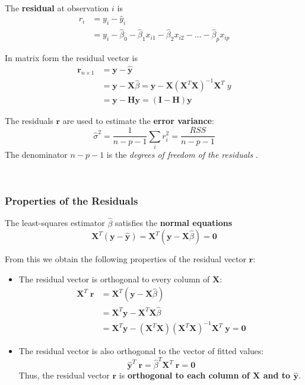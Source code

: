 \documentclass[
]{book}
\begin{document}
~

The \textbf{residual} at observation \(i\) is
\begin{align*}
r_{i} &= y_i - \hat{y}_i \\
&= y_i - \hat{\beta}_0 - \hat{\beta}_1 x_{i1} - \hat{\beta}_2 x_{i2} - \ldots - \hat{\beta}_p x_{ip}
\end{align*}

In matrix form the residual vector is
\begin{align*}
\mathbf{r}_{n\times 1} &= \mathbf{y} - \hat{\mathbf{y}} \\
&= \mathbf{y} - \mathbf{X}\hat{\beta} = \mathbf{y} - \mathbf{X} (\mathbf{X}^T\mathbf{X})^{-1} \mathbf{X}^T\;  y \\
&= \mathbf{y} - \mathbf{H} \mathbf{y} = (\mathbf{I} -\mathbf{H}) \mathbf{y}
\end{align*}

The residuals \(\mathbf{r}\) are used to estimate the \textbf{error variance}:
\[\hat{\sigma}^2 = \frac{1}{n-p-1}\sum_i r_i^2 = \frac{RSS}{n-p-1}\]
The denominator \(n-p-1\) is the \emph{degrees of freedom of the residuals} .

~

\subsubsection*{Properties of the Residuals}\label{properties-of-the-residuals}

The least-squares estimator \(\hat{\beta}\) satisfies the \textbf{normal equations}
\[\mathbf{X}^T (\mathbf{y} - \hat{\mathbf{y}}) = \mathbf{X}^T (\mathbf{y} - \mathbf{X}\hat{\beta}) = \mathbf{0}\]

From this we obtain the following properties of the residual vector \(\mathbf{r}\):

\begin{itemize}
\item
  The residual vector is orthogonal to every column of \(\mathbf{X}\):
  \begin{align*}
  \mathbf{X}^T\; \mathbf{r} &= \mathbf{X}^T (\mathbf{y}-\mathbf{X}\hat{\beta})\\
  &= \mathbf{X}^T \mathbf{y} - \mathbf{X}^T\mathbf{X}\hat{\beta}\\
  &= \mathbf{X}^T \mathbf{y} -  (\mathbf{X}^T \mathbf{X} )(\mathbf{X}^T\mathbf{X})^{-1} \mathbf{X}^T\; \mathbf{y} = \mathbf{0}
  \end{align*}
\item
  The residual vector is also orthogonal to the vector of fitted values:
  \[\hat{\mathbf{y}}^T \;\mathbf{r} = \hat{\beta}^{T} \mathbf{X}^{T} \;\mathbf{r} = \mathbf{0}\]
  Thus, the residual vector \(\mathbf{r}\) is \textbf{orthogonal to each column of \(\mathbf{X}\) and to \(\hat{\mathbf{y}}\)}.
\end{itemize}
\end{document}
